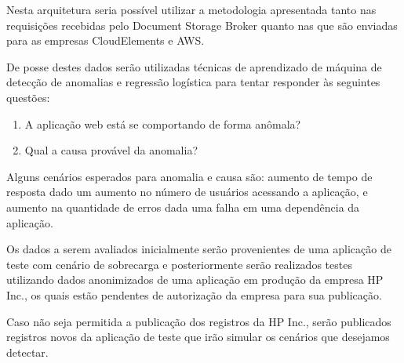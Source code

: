Nesta arquitetura seria possível utilizar a metodologia apresentada tanto nas
requisições recebidas pelo Document Storage Broker quanto nas que são enviadas
para as empresas CloudElements e AWS.

De posse destes dados serão utilizadas técnicas de aprendizado de máquina de
detecção de anomalias e regressão logística para tentar responder às seguintes
questões:

\begin{enumerate}
  \item A aplicação web está se comportando de forma anômala?
  \item Qual a causa provável da anomalia?
\end{enumerate}

Alguns cenários esperados para anomalia e causa são: aumento de tempo de resposta
dado um aumento no número de usuários acessando a aplicação, e aumento na
quantidade de erros dada uma falha em uma dependência da aplicação.

Os dados a serem avaliados inicialmente serão provenientes de uma aplicação de
teste com cenário de sobrecarga e posteriormente serão realizados testes utilizando
dados anonimizados de uma aplicação em produção da empresa HP Inc., os quais estão
pendentes de autorização da empresa para sua publicação.

Caso não seja permitida a publicação dos registros da HP Inc., serão publicados
registros novos da aplicação de teste que irão simular os cenários que desejamos
detectar.

